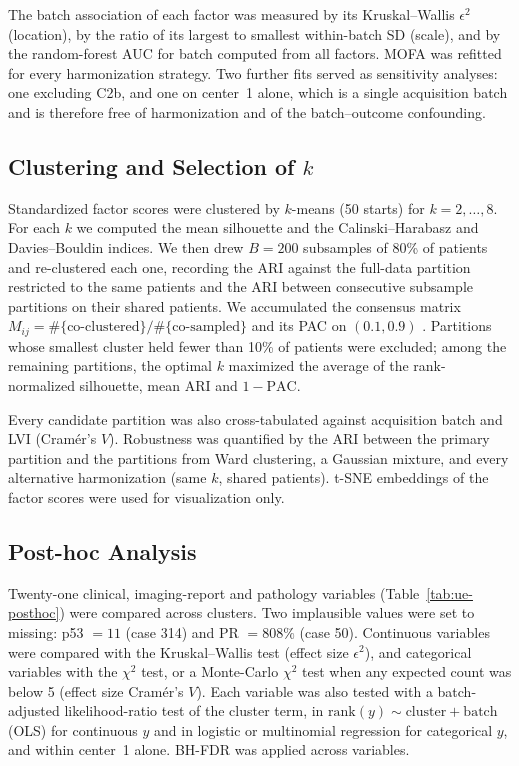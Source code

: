 \documentclass[conference]{IEEEtran}
\begin{document}
The batch association of each factor was measured by its Kruskal--Wallis $\epsilon^2$ (location), by the ratio of its largest to smallest within-batch SD (scale), and by the random-forest AUC for batch computed from all factors. MOFA was refitted for every harmonization strategy. Two further fits served as sensitivity analyses: one excluding C2b, and one on center~1 alone, which is a single acquisition batch and is therefore free of harmonization and of the batch--outcome confounding.

\subsection{Clustering and Selection of $k$}

Standardized factor scores were clustered by $k$-means (50 starts) for $k=2,\dots,8$. For each $k$ we computed the mean silhouette and the Calinski--Harabasz and Davies--Bouldin indices. We then drew $B=200$ subsamples of 80\% of patients and re-clustered each one, recording the ARI against the full-data partition restricted to the same patients and the ARI between consecutive subsample partitions on their shared patients. We accumulated the consensus matrix $M_{ij}=\#\{\text{co-clustered}\}/\#\{\text{co-sampled}\}$ and its PAC on $(0.1,0.9)$ \cite{monti2003consensus,senbabaoglu2014critical}. Partitions whose smallest cluster held fewer than 10\% of patients were excluded; among the remaining partitions, the optimal $k$ maximized the average of the rank-normalized silhouette, mean ARI and $1-\mathrm{PAC}$.

Every candidate partition was also cross-tabulated against acquisition batch and LVI (Cram\'er's $V$). Robustness was quantified by the ARI between the primary partition and the partitions from Ward clustering, a Gaussian mixture, and every alternative harmonization (same $k$, shared patients). t-SNE embeddings of the factor scores were used for visualization only.

\subsection{Post-hoc Analysis}

Twenty-one clinical, imaging-report and pathology variables (Table~\ref{tab:ue-posthoc}) were compared across clusters. Two implausible values were set to missing: p53 $=11$ (case 314) and PR $=808\%$ (case 50). Continuous variables were compared with the Kruskal--Wallis test (effect size $\epsilon^2$), and categorical variables with the $\chi^2$ test, or a Monte-Carlo $\chi^2$ test when any expected count was below 5 (effect size Cram\'er's $V$). Each variable was also tested with a batch-adjusted likelihood-ratio test of the cluster term, in $\mathrm{rank}(y)\sim\text{cluster}+\text{batch}$ (OLS) for continuous $y$ and in logistic or multinomial regression for categorical $y$, and within center~1 alone. BH-FDR was applied across variables.
\end{document}
